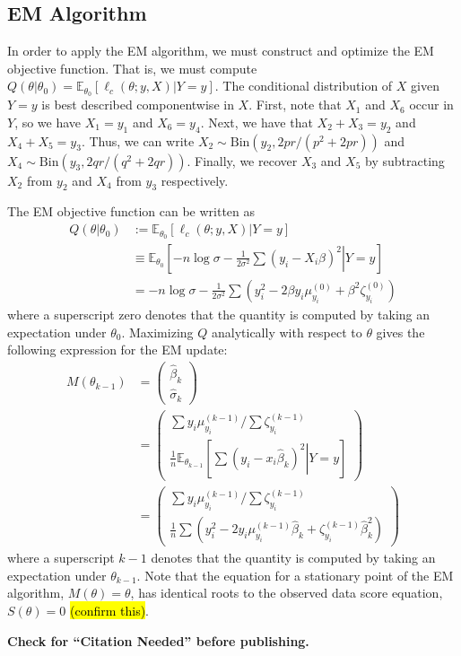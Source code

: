 \documentclass[11pt, oneside]{article}   	%
\newcommand{\bE}{\mathbb{E}}
\begin{document}
\begin{appendices}
    \subsection{EM Algorithm}

    In order to apply the EM algorithm, we must construct and optimize the EM objective function. That is, we must compute $Q(\theta|\theta_0) = \bE_{\theta_0} \left[ \ell_c(\theta; y, X) | Y=y \right]$. The conditional distribution of $X$ given $Y=y$ is best described componentwise in $X$. First, note that $X_1$ and $X_6$ occur in $Y$, so we have $X_1 = y_1$ and $X_6 = y_4$. Next, we have that $X_2 + X_3 = y_2$ and $X_4 + X_5 = y_3$. Thus, we can write $X_2 \sim \mathrm{Bin}(y_2, 2pr / (p^2 + 2pr))$ and $X_4 \sim \mathrm{Bin}(y_3, 2qr / (q^2 + 2qr))$. Finally, we recover $X_3$ and $X_5$ by subtracting $X_2$ from $y_2$ and $X_4$ from $y_3$ respectively.
    
    The EM objective function can be written as
    \begin{align}
		Q(\theta | \theta_0) &:= \bE_{\theta_0} [\ell_c (\theta; y, X) | Y=y]\\
		&\equiv \bE_{\theta_0} \left[ \left. -n \log \sigma - \frac{1}{2\sigma^2} \sum (y_i - X_i \beta)^2 \right| Y=y \right]\\
        &= -n \log \sigma - \frac{1}{2\sigma^2} \sum \left( y_i^2 - 2 \beta y_i \mu_{y_i}^{(0)} + \beta^2 \zeta^{(0)}_{y_i} \right)
	\end{align}
    where a superscript zero denotes that the quantity is computed by taking an expectation under $\theta_0$. Maximizing $Q$ analytically with respect to $\theta$ gives the following expression for the EM update:
    \begin{align}
        M(\theta_{k-1}) &= \begin{pmatrix}
            \hat{\beta}_k\\ \hat{\sigma}_k
        \end{pmatrix}\\
        &= \begin{pmatrix}
            {\sum y_i \mu_{y_i}^{(k-1)}} / {\sum \zeta_{y_i}^{(k-1)}}\\
            \frac{1}{n} \bE_{\theta_{k-1}} \left[ \left. \sum (y_i - x_i \hat{\beta}_k)^2 \right| Y=y \right]
        \end{pmatrix}\\
        &= \begin{pmatrix}
            {\sum y_i \mu_{y_i}^{(k-1)}} / {\sum \zeta_{y_i}^{(k-1)}}\\
            \frac{1}{n} \sum \left( y_i^2 - 2 y_i \mu_{y_i}^{(k-1)} \hat{\beta}_k  + \zeta^{(k-1)}_{y_i} \hat{\beta}_k^2  \right)
        \end{pmatrix}
    \end{align}
    where a superscript $k-1$ denotes that the quantity is computed by taking an expectation under $\theta_{k-1}$. Note that the equation for a stationary point of the EM algorithm, $M(\theta) = \theta$, has identical roots to the observed data score equation, $S(\theta) = 0$ \hl{(confirm this)}.

\end{appendices}

\newpage

\textbf{Check for ``Citation Needed'' before publishing.}




\printindex
\end{document}
